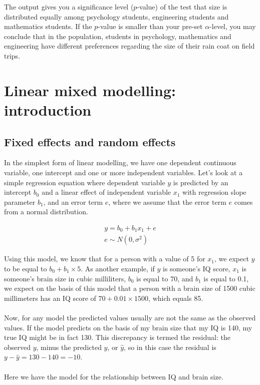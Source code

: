 \documentclass[]{report}\usepackage[]{graphicx}\usepackage[]{color}
\begin{document}
The output gives you a significance level ($p$-value) of the test that size is distributed equally among psychology students, engineering students and mathematics students. If the $p$-value is smaller than your pre-set $\alpha$-level, you may conclude that in the population, students in psychology, mathematics and engineering have different preferences regarding the size of their rain coat on field trips. 






\chapter{Linear mixed modelling: introduction}\label{chap:mixed}


\section{Fixed effects and random effects}
In the simplest form of linear modelling, we have one dependent continuous variable, one intercept and one or more independent variables. Let's look at a simple regression equation where dependent variable $y$ is predicted by an intercept $b_0$ and a linear effect of independent variable $x_1$ with regression slope parameter $b_1$, and an error term $e$, where we assume that the error term $e$ comes from a normal distribution. 


\begin{eqnarray}
y = b_0 + b_1 x_1 + e \\
e \sim N(0, \sigma^2)
\end{eqnarray}

Using this model, we know that for a person with a value of 5 for $x_1$, we expect $y$ to be equal to $b_0 + b_1 \times 5$. As another example, if $y$ is someone's IQ score, $x_1$ is someone's brain size in cubic milliliters, $b_0$ is equal to 70, and $b_1$ is equal to 0.1, we expect on the basis of this model that a person with a brain size of 1500 cubic millimeters has an IQ score of $70 + 0.01 \times 1500$, which equals 85.
\\
\\
Now, for any model the predicted values usually are not the same as the observed values. If the model predicts on the basis of my brain size that my IQ is 140, my true IQ might be in fact 130. This discrepancy is termed the residual: the observed $y$, minus the predicted $y$, or $\hat{y}$, so in this case the residual is $y - \hat{y}=130-140= -10$.
\\
\\
Here we have the model for the relationship between IQ and brain size.
\end{document}
